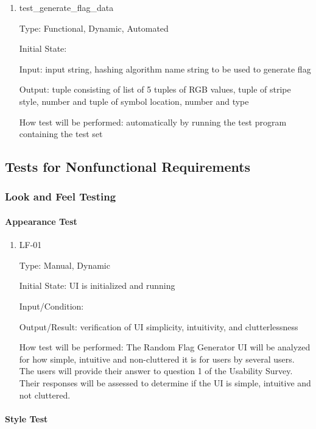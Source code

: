\documentclass[12pt, titlepage]{article}
\begin{document}
\begin{enumerate}
\item{test\_generate\_flag\_data\\}

Type: Functional, Dynamic, Automated

Initial State:

Input: input string, hashing algorithm name string to be used to generate flag

Output: tuple consisting of list of 5 tuples of RGB values, tuple of stripe
style, number and tuple of symbol location, number and type

How test will be performed: automatically by running the test program
containing the test set

\end{enumerate}

\subsection{Tests for Nonfunctional Requirements}

\subsubsection{Look and Feel Testing}
		
\paragraph{Appearance Test}

\begin{enumerate}

\item{LF-01\\}

Type: Manual, Dynamic

Initial State: UI is initialized and running

Input/Condition: 

Output/Result: verification of UI simplicity, intuitivity, and clutterlessness

How test will be performed: The Random Flag Generator UI will be analyzed for
how simple, intuitive and non-cluttered it is for users by several users. The
users will provide their answer to question 1 of the Usability Survey. Their
responses will be assessed to determine if the UI is simple, intuitive and not
cluttered.

\end{enumerate}

\paragraph{Style Test}
\end{document}

